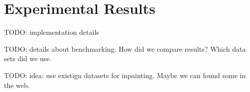 
\section{Experimental Results}
\label{sec:results}
TODO: implementation details

TODO: details about benchmarking. How did we compare results? Which data sets did we use.

TODO: idea: use existign datasets for inpainting. Maybe we can found some in the web.

